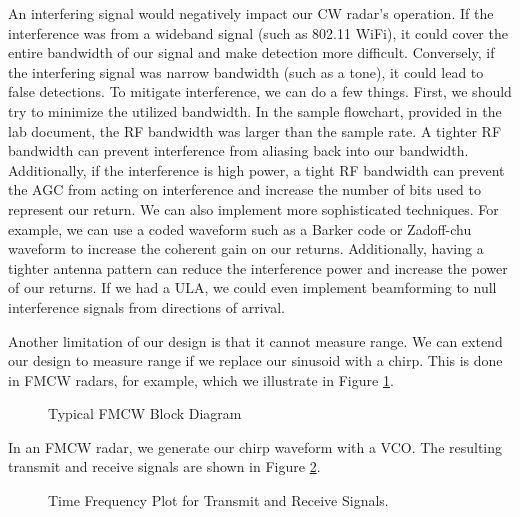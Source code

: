 \documentclass{article}
\begin{document}
An interfering signal would negatively impact our CW radar's operation. If the interference was from a wideband signal (such as 802.11 WiFi), it could cover the entire bandwidth of our signal and make detection more difficult. Conversely, if the interfering signal was narrow bandwidth (such as a tone), it could lead to false detections. To mitigate interference, we can do a few things. First, we should try to minimize the utilized bandwidth. In the sample flowchart, provided in the lab document, the RF bandwidth was larger than the sample rate. A tighter RF bandwidth can prevent interference from aliasing back into our bandwidth. Additionally, if the interference is high power, a tight RF bandwidth can prevent the AGC from acting on interference and increase the number of bits used to represent our return. We can also implement more sophisticated techniques. For example, we can use a coded waveform such as a Barker code or Zadoff-chu waveform to increase the coherent gain on our returns. Additionally, having a tighter antenna pattern can reduce the interference power and increase the power of our returns. If we had a ULA, we could even implement beamforming to null interference signals from directions of arrival.

Another limitation of our design is that it cannot measure range. We can extend our design to measure range if we replace our sinusoid with a chirp. This is done in FMCW radars, for example, which we illustrate in Figure \ref{fig::fmcw_radar}.

\begin{figure}[H]
    	\centering
    	\caption{Typical FMCW Block Diagram \cite{9613183}}
    	\label{fig::fmcw_radar}
\end{figure}
	
\noindent In an FMCW radar, we generate our chirp waveform with a VCO. The resulting transmit and receive signals are shown in Figure \ref{fig::fmcw_spectrogram}.

\begin{figure}[H]
    	\centering
    	\caption{Time Frequency Plot for Transmit and Receive Signals.\cite{Long2019AssistingTV}}
    	\label{fig::fmcw_spectrogram}
\end{figure}
\end{document}
